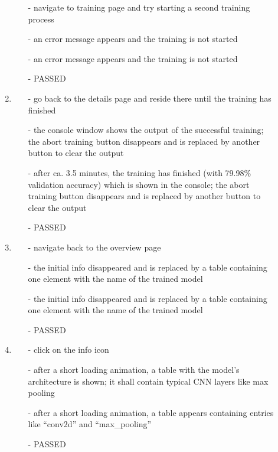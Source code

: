 \begin{description}
\begin{enumerate}
		\begin{itemize}
			\item [-] navigate to training page and try starting a second training process
			\item [-] an error message appears and the training is not started
			\item [-] an error message appears and the training is not started
			\item [-] PASSED
		\end{itemize}
		\item
		\begin{itemize}
			\item [-] go back to the details page and reside there until the training has finished
			\item [-] the console window shows the output of the successful training; the abort training button disappears and is replaced by another button to clear the output
			\item [-] after ca. 3.5 minutes, the training has finished (with 79.98\% validation accuracy) which is shown in the console; the abort training button disappears and is replaced by another button to clear the output
			\item [-] PASSED
		\end{itemize}
		\item
		\begin{itemize}
			\item [-] navigate back to the overview page
			\item [-] the initial info disappeared and is replaced by a table containing one element with the name of the trained model
			\item [-] the initial info disappeared and is replaced by a table containing one element with the name of the trained model
			\item [-] PASSED
		\end{itemize}
		\item
		\begin{itemize}
			\item [-] click on the info icon
			\item [-] after a short loading animation, a table with the model's architecture is shown; it shall contain typical CNN layers like max pooling
			\item [-] after a short loading animation, a table appears containing entries like \enquote{conv2d} and \enquote{max\_pooling}
			\item [-] PASSED
		\end{itemize}

\end{enumerate}
\end{description}
